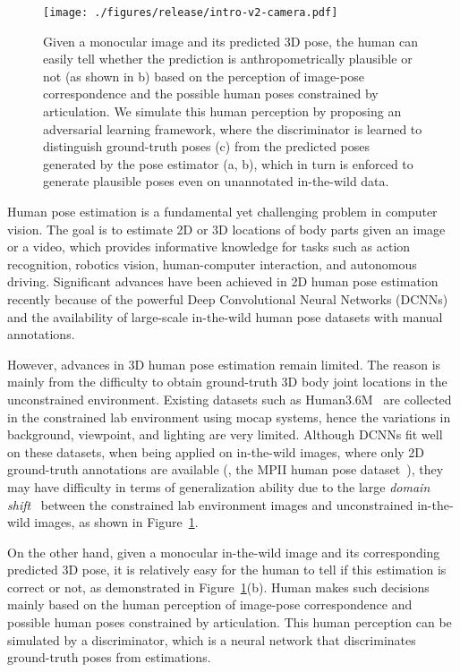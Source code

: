 \documentclass[10pt,twocolumn,letterpaper]{article}
\begin{document}
\begin{figure}[t]
	\begin{center}
		\texttt{[image: ./figures/release/intro-v2-camera.pdf]}
	\end{center}
	\vspace{-0.5em}
	\caption{Given a monocular image and its predicted 3D pose, the human can easily tell whether the prediction is anthropometrically plausible or not  (as shown in b) based on the perception of image-pose correspondence and the possible human poses constrained by articulation. 
	We simulate this human perception by proposing an adversarial learning framework, where the discriminator is learned to distinguish ground-truth poses (c) from the predicted poses generated by the pose estimator (a, b), which in turn is enforced to generate plausible poses even on unannotated in-the-wild data. 
	}
	\label{fig:intro}
	\vspace{-1em}
\end{figure}


Human pose estimation is a fundamental yet challenging problem in computer vision. 
The goal is to estimate 2D or 3D locations of body parts given an image or a video, which provides informative knowledge for tasks such as action recognition, robotics vision, human-computer interaction, and autonomous driving. 
Significant advances have been achieved in 2D human pose estimation recently because of the powerful Deep Convolutional Neural Networks (DCNNs) and the availability of large-scale in-the-wild human pose datasets with manual annotations. 

However, advances in 3D human pose estimation remain limited. 
The reason is mainly from the difficulty to obtain ground-truth 3D body joint locations in the unconstrained environment. 
Existing datasets such as Human3.6M~\cite{ionescu2014human36m} are collected in the constrained lab environment using mocap systems, hence the variations in background, viewpoint, and lighting are very limited. 
Although DCNNs fit well on these datasets, when being applied on in-the-wild images, where only 2D ground-truth annotations are available (\eg, the MPII human pose dataset~\cite{andriluka20142d}), they may have difficulty in terms of generalization ability due to the large \textit{domain shift}~\cite{tzeng2017adversarial} between the constrained lab environment images and unconstrained in-the-wild images, as shown in Figure~\ref{fig:intro}. 




On the other hand, given a monocular in-the-wild image and its corresponding predicted 3D pose, it is relatively easy for the human to tell if this estimation is correct or not, as demonstrated in Figure~\ref{fig:intro}(b). 
Human makes such decisions mainly based on the human perception of image-pose correspondence and possible human poses constrained by articulation. 
This human perception can be simulated by a discriminator, which is a neural network that discriminates ground-truth poses from estimations.
\end{document}
